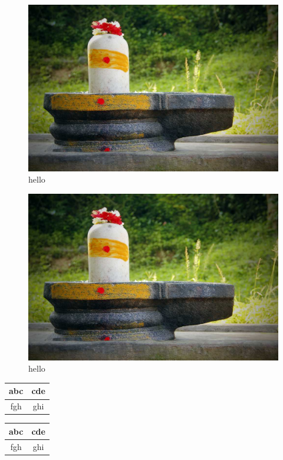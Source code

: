 \documentclass{article}
\begin{document}
\begin{figure}
\includegraphics{shiv.jpg}
\caption{hello}
\end{figure}

\begin{figure}
\includegraphics{shiv.jpg}
\caption{hello}
\end{figure}

\begin{tabular}{|c|c|}
\hline
abc & cde \\ \hline
fgh & ghi \\ \hline
\end{tabular}

\begin{tabular}{|c|c|}
\hline
abc & cde \\ \hline
fgh & ghi \\ \hline
\end{tabular}
\end{document}
